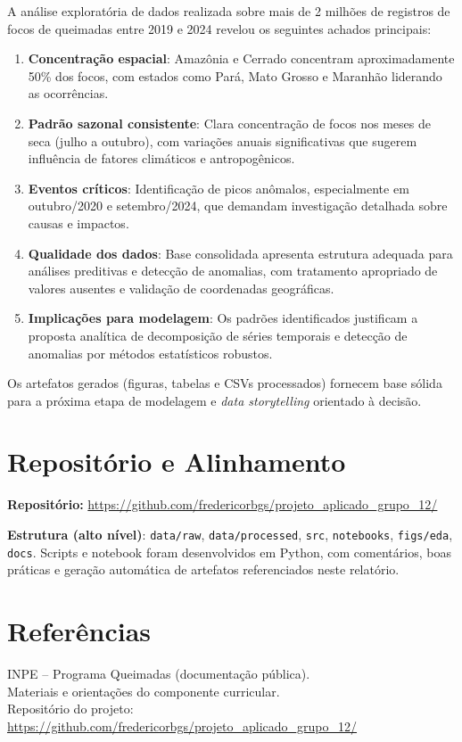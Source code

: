 \documentclass[12pt,a4paper]{report}
\newcommand{\repositorio}{\url{https://github.com/fredericorbgs/projeto_aplicado_grupo_12/}}
\begin{document}
A análise exploratória de dados realizada sobre mais de 2 milhões de registros de focos de queimadas entre 2019 e 2024 revelou os seguintes achados principais:

\begin{enumerate}
  \item \textbf{Concentração espacial}: Amazônia e Cerrado concentram aproximadamente 50\% dos focos, com estados como Pará, Mato Grosso e Maranhão liderando as ocorrências.
  
  \item \textbf{Padrão sazonal consistente}: Clara concentração de focos nos meses de seca (julho a outubro), com variações anuais significativas que sugerem influência de fatores climáticos e antropogênicos.
  
  \item \textbf{Eventos críticos}: Identificação de picos anômalos, especialmente em outubro/2020 e setembro/2024, que demandam investigação detalhada sobre causas e impactos.
  
  \item \textbf{Qualidade dos dados}: Base consolidada apresenta estrutura adequada para análises preditivas e detecção de anomalias, com tratamento apropriado de valores ausentes e validação de coordenadas geográficas.
  
  \item \textbf{Implicações para modelagem}: Os padrões identificados justificam a proposta analítica de decomposição de séries temporais e detecção de anomalias por métodos estatísticos robustos.
\end{enumerate}

\noindent Os artefatos gerados (figuras, tabelas e CSVs processados) fornecem base sólida para a próxima etapa de modelagem e \textit{data storytelling} orientado à decisão.

\chapter{Repositório e Alinhamento}

\noindent \textbf{Repositório:} \repositorio

\noindent\textbf{Estrutura (alto nível)}: \texttt{data/raw}, \texttt{data/processed}, \texttt{src}, \texttt{notebooks}, \texttt{figs/eda}, \texttt{docs}.  
Scripts e notebook foram desenvolvidos em Python, com comentários, boas práticas e geração automática de artefatos referenciados neste relatório.

\chapter*{Referências}
INPE -- Programa Queimadas (documentação pública).\\
Materiais e orientações do componente curricular.\\
Repositório do projeto: \repositorio
\end{document}
